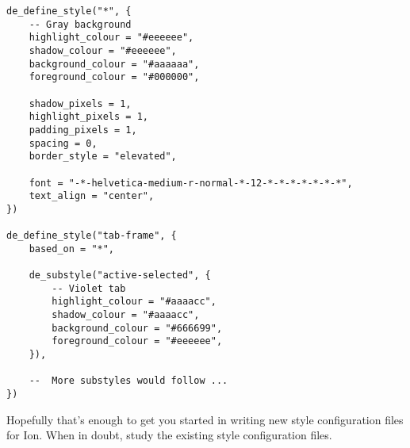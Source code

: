\begin{verbatim}
de_define_style("*", {
    -- Gray background
    highlight_colour = "#eeeeee",
    shadow_colour = "#eeeeee",
    background_colour = "#aaaaaa",
    foreground_colour = "#000000",
    
    shadow_pixels = 1,
    highlight_pixels = 1,
    padding_pixels = 1,
    spacing = 0,
    border_style = "elevated",
    
    font = "-*-helvetica-medium-r-normal-*-12-*-*-*-*-*-*-*",
    text_align = "center",
})

de_define_style("tab-frame", {
    based_on = "*",
    
    de_substyle("active-selected", {
        -- Violet tab
        highlight_colour = "#aaaacc",
        shadow_colour = "#aaaacc",
        background_colour = "#666699",
        foreground_colour = "#eeeeee",
    }),

    --  More substyles would follow ...
})
\end{verbatim}


Hopefully that's enough to get you started in writing new style
configuration files for Ion. When in doubt, study the existing
style configuration files.

